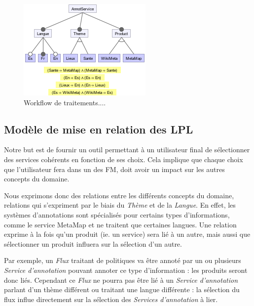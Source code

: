 \documentclass[]{easychair}
\newcommand{\comment}[4]{\par\noindent\hspace*{-0.5cm}{\parbox{\columnwidth}{\textbf{\color{#1}//#2[#3]:#4}}}\par}
\newcommand{\si}[1]{\comment{red}{}{#1}{SI}}
\begin{document}
\begin{figure}[htb!]
	\begin{centering}
	\includegraphics[scale=0.7]{FM.png}
	\caption{Workflow de traitements....}
	\label{fig:mmFM}
	\end{centering}
\end{figure}

\subsection{Modèle de mise en relation des LPL}
Notre but est de fournir un outil permettant à un utilisateur final de sélectionner des services cohérents en fonction de ses choix. Cela implique que chaque choix que l'utilisateur fera dans un des FM, doit avoir un impact sur les autres concepts du domaine. 

Nous exprimons donc des relations entre les différents concepts du domaine, relations qui s'expriment par le biais du \textit{Thème} et de la \textit{Langue}. En effet, les systèmes d'annotations sont spécialisés pour certains types d'informations, comme le service MetaMap \cite{MetaMap} et ne traitent que certaines langues. Une relation exprime à la fois qu'un produit (ie. un service) sera lié à un autre, mais aussi que sélectionner un produit influera sur la sélection d'un autre.

Par exemple, un \textit{Flux} traitant de politiques va être annoté par un ou plusieurs \textit{Service d'annotation} pouvant annoter ce type d'information : les produits seront donc liés. Cependant ce \textit{Flux} ne pourra pas être lié à un \textit{Service d'annotation} parlant d'un thème différent ou traitant une langue différente : la sélection du flux influe directement sur la sélection des \textit{Services d'annotation} à lier.
\end{document}

